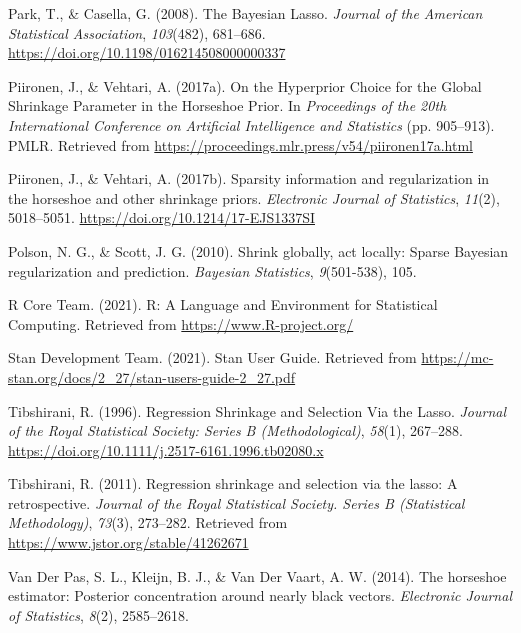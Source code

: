 \documentclass[
  man, donotrepeattitle,floatsintext]{apa6}
\newlength{\cslhangindent}
\newlength{\cslentryspacingunit} %
\newenvironment{CSLReferences}[2] %
 {%
  \setlength{\parindent}{0pt}
  \ifodd #1
  \let\oldpar\par
  \def\par{\hangindent=\cslhangindent\oldpar}
  \fi
  \setlength{\parskip}{#2\cslentryspacingunit}
 }%
 {}
\begin{document}
\begin{CSLReferences}{1}{0}
\leavevmode{}%
Park, T., \& Casella, G. (2008). The {Bayesian} {Lasso}. \emph{Journal of the American Statistical Association}, \emph{103}(482), 681--686. \url{https://doi.org/10.1198/016214508000000337}

\leavevmode{}%
Piironen, J., \& Vehtari, A. (2017a). On the {Hyperprior} {Choice} for the {Global} {Shrinkage} {Parameter} in the {Horseshoe} {Prior}. In \emph{Proceedings of the 20th {International} {Conference} on {Artificial} {Intelligence} and {Statistics}} (pp. 905--913). PMLR. Retrieved from \url{https://proceedings.mlr.press/v54/piironen17a.html}

\leavevmode{}%
Piironen, J., \& Vehtari, A. (2017b). Sparsity information and regularization in the horseshoe and other shrinkage priors. \emph{Electronic Journal of Statistics}, \emph{11}(2), 5018--5051. \url{https://doi.org/10.1214/17-EJS1337SI}

\leavevmode{}%
Polson, N. G., \& Scott, J. G. (2010). Shrink globally, act locally: {Sparse} {Bayesian} regularization and prediction. \emph{Bayesian Statistics}, \emph{9}(501-538), 105.

\leavevmode{}%
R Core Team. (2021). R: {A} {Language} and {Environment} for {Statistical} {Computing}. Retrieved from \url{https://www.R-project.org/}

\leavevmode{}%
Stan Development Team. (2021). Stan {User} {Guide}. Retrieved from \url{https://mc-stan.org/docs/2_27/stan-users-guide-2_27.pdf}

\leavevmode{}%
Tibshirani, R. (1996). Regression {Shrinkage} and {Selection} {Via} the {Lasso}. \emph{Journal of the Royal Statistical Society: Series B (Methodological)}, \emph{58}(1), 267--288. \url{https://doi.org/10.1111/j.2517-6161.1996.tb02080.x}

\leavevmode{}%
Tibshirani, R. (2011). Regression shrinkage and selection via the lasso: A retrospective. \emph{Journal of the Royal Statistical Society. Series B (Statistical Methodology)}, \emph{73}(3), 273--282. Retrieved from \url{https://www.jstor.org/stable/41262671}

\leavevmode{}%
Van Der Pas, S. L., Kleijn, B. J., \& Van Der Vaart, A. W. (2014). The horseshoe estimator: {Posterior} concentration around nearly black vectors. \emph{Electronic Journal of Statistics}, \emph{8}(2), 2585--2618.


\end{CSLReferences}
\end{document}
